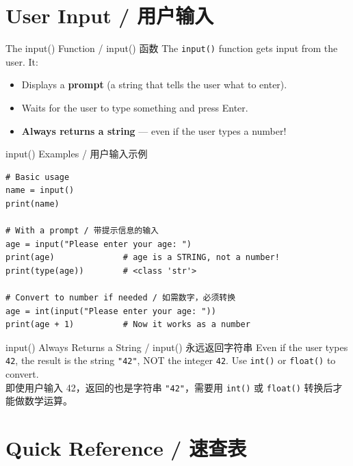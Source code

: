 \documentclass[11pt,a4paper]{article}
\begin{document}
\section{User Input / 用户输入}

\begin{concept}{The input() Function / input() 函数}
    The \texttt{input()} function gets input from the user. It:
    \begin{itemize}[itemsep=0.3em]
        \item Displays a \textbf{prompt} (a string that tells the user what to enter).
        \item Waits for the user to type something and press Enter.
        \item \textbf{Always returns a string} — even if the user types a number!
    \end{itemize}
\end{concept}

\begin{examplebox}{input() Examples / 用户输入示例}
\begin{lstlisting}
# Basic usage
name = input()
print(name)

# With a prompt / 带提示信息的输入
age = input("Please enter your age: ")
print(age)              # age is a STRING, not a number!
print(type(age))        # <class 'str'>

# Convert to number if needed / 如需数字，必须转换
age = int(input("Please enter your age: "))
print(age + 1)          # Now it works as a number
\end{lstlisting}
\end{examplebox}

\begin{warning}{input() Always Returns a String / input() 永远返回字符串}
    Even if the user types \texttt{42}, the result is the string \texttt{"42"}, NOT the integer \texttt{42}. Use \texttt{int()} or \texttt{float()} to convert. \\
    即使用户输入 42，返回的也是字符串 \texttt{"42"}，需要用 \texttt{int()} 或 \texttt{float()} 转换后才能做数学运算。
\end{warning}

\section{Quick Reference / 速查表}
\end{document}

